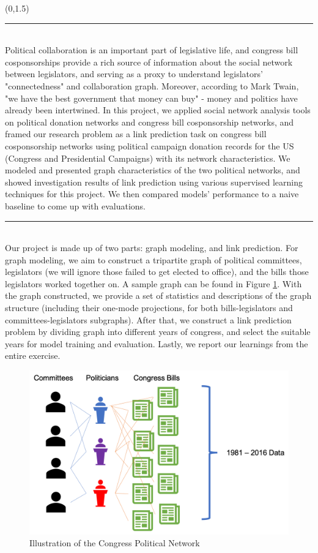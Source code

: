 \documentclass[a0]{a0poster}
\def\Head#1{\noindent{\LARGE\color{bluegray} #1}\bigskip}
\begin{document}
\begin{textblock}{7.0}(0,1.5)

\hrule\medskip
\Head{Introduction}\\
Political collaboration is an important part of legislative life, and congress bill cosponsorships provide a rich source of information about the social network between legislators, and serving as a proxy to understand legislators' "connectedness" and collaboration graph. Moreover, according to Mark Twain, "we have the best government that money can buy" - money and politics have already been intertwined. In this project, we applied social network analysis tools on political donation networks and congress bill cosponsorship networks, and framed our research problem as a link prediction task on congress bill cosponsorship networks using political campaign donation records for the US (Congress and Presidential Campaigns) with its network characteristics. We modeled and presented graph characteristics of the two political networks, and showed investigation results of link prediction using various supervised learning techniques for this project. We then compared models' performance to a naive baseline to come up with evaluations. 

\medskip
\hrule\medskip
\Head{Method}\\
Our project is made up of two parts: graph modeling, and link prediction. For graph modeling, we aim to construct a tripartite graph of political committees, legislators (we will ignore those failed to get elected to office), and the bills those legislators worked together on. A sample graph can be found in Figure \ref{fig_sim}. With the graph constructed, we provide a set of statistics and descriptions of the graph structure (including their one-mode projections, for both bills-legislators and committees-legislators subgraphs). After that, we construct a link prediction problem by dividing graph into different years of congress, and select the suitable years for model training and evaluation. Lastly, we report our learnings from the entire exercise. 

\begin{figure}[!t]
\centering
\includegraphics[width=5in]{network_illustration2}
\caption{Illustration of the Congress Political Network}
\label{fig_sim}
\end{figure}



\end{textblock}
\end{document}
